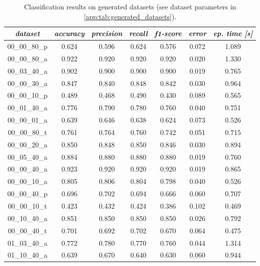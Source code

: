 \begin{table}[H]
\centering
\caption{Classification results on generated datasets (see dataset parameters in \cref{app:tab:generated_datasets}).}
\label{tab:classification_results}
\resizebox{\textwidth}{!} {
\begin{tabular}{|c|c|c|c|c|c|c|}
\hline
\textit{dataset} & \textit{accuracy} & \textit{precision} & \textit{recall} & \textit{f1-score} & \textit{error} & \textit{ep. time {[}s{]}} \\
\hline
00\_00\_80\_p 	& 0.624 	& 0.596 	& 0.624 	& 0.576 	& 0.072 	& 1.089 	 \\ \hline
00\_00\_80\_a 	& 0.922 	& 0.920 	& 0.920		& 0.920 	& 0.020 	& 1.330 	 \\ \hline
00\_03\_40\_a 	& 0.902 	& 0.900 	& 0.900 	& 0.900 	& 0.019 	& 0.765 	 \\ \hline
00\_00\_30\_a 	& 0.847 	& 0.840 	& 0.848 	& 0.842 	& 0.030 	& 0.964 	 \\ \hline
00\_00\_10\_p 	& 0.489 	& 0.468 	& 0.490 	& 0.430 	& 0.089 	& 0.565 	 \\ \hline
00\_01\_40\_a 	& 0.776 	& 0.790 	& 0.780 	& 0.760 	& 0.040 	& 0.751 	 \\ \hline
00\_00\_01\_a 	& 0.639 	& 0.646 	& 0.638 	& 0.624 	& 0.073 	& 0.526 	 \\ \hline
00\_00\_80\_t	& 0.761 	& 0.764 	& 0.760 	& 0.742 	& 0.051 	& 0.715 	 \\ \hline
00\_00\_20\_a 	& 0.850 	& 0.848 	& 0.850 	& 0.846 	& 0.030 	& 0.894 	 \\ \hline
00\_05\_40\_a 	& 0.884 	& 0.880 	& 0.880 	& 0.880 	& 0.019 	& 0.760 	 \\ \hline
00\_00\_40\_a 	& 0.923 	& 0.920 	& 0.920 	& 0.920 	& 0.019 	& 0.865 	 \\ \hline
00\_00\_10\_a 	& 0.805 	& 0.806 	& 0.804 	& 0.798 	& 0.040 	& 0.526 	 \\ \hline
00\_00\_40\_p 	& 0.696 	& 0.702 	& 0.694 	& 0.666 	& 0.060 	& 0.707 	 \\ \hline
00\_00\_10\_t 	& 0.423 	& 0.432 	& 0.424 	& 0.386 	& 0.102 	& 0.469 	 \\ \hline
00\_10\_40\_a 	& 0.851 	& 0.850 	& 0.850 	& 0.850 	& 0.026 	& 0.792 	 \\ \hline
00\_00\_40\_t	& 0.701 	& 0.692 	& 0.702 	& 0.670 	& 0.064 	& 0.475 	 \\ \hline
01\_03\_40\_a 	& 0.772 	& 0.780 	& 0.770 	& 0.760 	& 0.044 	& 1.314 	 \\ \hline
01\_10\_40\_a 	& 0.639 	& 0.670 	& 0.640 	& 0.630 	& 0.060 	& 0.944 	 \\ \hline

\end{tabular}}
\end{table}
